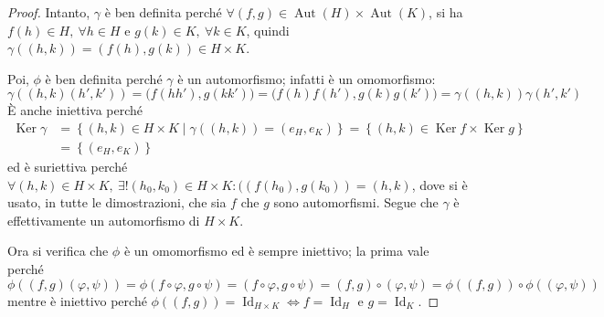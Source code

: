 \documentclass[12pt]{scrartcl}
\theoremstyle{style}
\numberwithin{equation}{subsection}
\begin{document}
	\begin{proof}
		Intanto, $\gamma$ \`e ben definita perch\'e $\forall (f , g) \in \operatorname{Aut} (H ) \times \operatorname{Aut}(K) $, si ha $f(h) \in H, \ \forall h \in H$ e $g(k) \in K, \ \forall k \in K$, quindi $\gamma((h,k)) = (f(h),g(k)) \in H \times  K$.
		
		Poi, $\phi $ \`e ben definita perch\'e $\gamma$ \`e un automorfismo; infatti \`e un omomorfismo:
		\[
		\gamma((h,k)(h',k'))=\big(f(hh'),g(kk')\big) = \big(f(h)f(h') , g(k) g(k')\big) =\gamma((h,k)) \gamma(h',k')
		\] 
		\`E anche iniettiva perch\'e 
\[
	\begin{split}
		\operatorname{Ker} \gamma &= \left\{ (h,k) \in H \times K  \mid \gamma((h,k)) = (e_H,e_K) \right\} = \left\{ (h,k) \in \operatorname{Ker} f \times \operatorname{Ker} g \right\} \\
					  &= \left\{ (e_H,e_K) \right\} 
	\end{split}
\] 
		ed \`e suriettiva perch\'e $\forall (h,k) \in H \times  K, \ \exists ! (h_0,k_0) \in H\times K : ((f(h_0),g(k_0)) = (h,k)$, dove si \`e usato, in tutte le dimostrazioni, che sia $f$ che $g$ sono automorfismi.
		Segue che $\gamma$ \`e effettivamente un automorfismo di $H \times K$.

Ora si verifica che $\phi $ \`e un omomorfismo ed \`e sempre iniettivo; la prima vale perch\'e 
\[
\phi ((f,g)(\varphi ,\psi )) = \phi (f\circ\varphi ,g\circ\psi ) = (f\circ\varphi , g \circ\psi )= (f,g)\circ(\varphi ,\psi )=\phi ((f,g))\circ \phi ((\varphi ,\psi ))
\] 
mentre \`e iniettivo perch\'e $\phi ((f,g))= \operatorname{Id} _{H\times K}  \iff f = \operatorname{Id} _H$ e $g = \operatorname{Id} _K$.


\end{proof}
\end{document}
